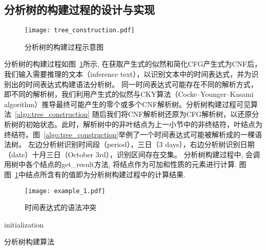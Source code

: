 \subsection{分析树的构建过程的设计与实现}

\begin{figure}[h]
    \centering
    \texttt{[image: tree\_construction.pdf]}
    \caption{分析树的构建过程示意图}
    \label{fig:tree_construction}
\end{figure}

分析树的构建过程如图~\ref{fig:tree_construction}所示, 在获取产生式的似然和简化CFG产生式为CNF后，我们输入需要推理的文本（inference text），以识别文本中的时间表达式，并为识别出的时间表达式构建语法分析树。
同一时间表达式可能存在不同的解析方式，即不同的解析树，我们利用产生式的似然与CKY算法（Cocke–Younger–Kasami algorithm）推导最终可能产生的零个或多个CNF解析树。分析树构建过程可见算法~\ref{algo:tree_construction}
随后我们将CNF解析树还原为CFG解析树，以还原分析树的初始状态。此时，解析树中的非叶结点为上一小节中的非终结符，叶结点为终结符。图~\ref{algo:tree_construction}举例了一个时间表达式可能被解析成的一棵语法树。
左边分析树识别时间段（period），三日（3 days），右边分析树识别日期（date）十月三日（October 3rd），识别区间存在交集。 分析树构建过程中, 会调用树中各个结点的get\_result方法, 将结点作为可加和性质的元素进行计算. 图
图~\ref{fig:tree_construction}中结点所含有的值即为分析树构建过程中的计算结果.


\begin{figure}[h]
    \centering
    \texttt{[image: example\_1.pdf]}
    \caption{时间表达式的语法冲突}
    \label{fig:example_1}
\end{figure}

\begin{algorithm}[h]
    \SetAlgoLined
    initialization\;
     {
    }
    \caption{分析树构建算法}
    \label{algo:tree_construction}
\end{algorithm}


